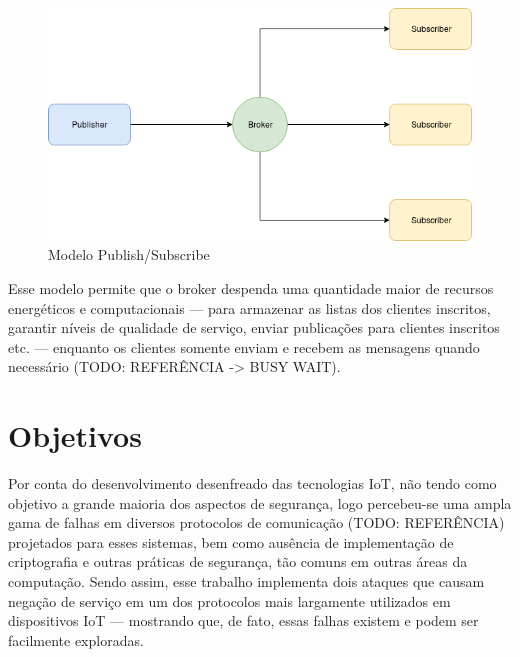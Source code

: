 \begin{figure}[htb]
 \caption{Modelo Publish/Subscribe}
 \label{publish-subscribe}
 \centering
 \includegraphics[scale=0.6]{images/publish-subscribe.png}
 \fautor
\end{figure}


Esse modelo permite que o broker despenda uma quantidade maior de recursos energéticos e computacionais --- para armazenar as listas dos clientes inscritos, garantir níveis de qualidade de serviço, enviar publicações para clientes inscritos etc. --- enquanto os clientes somente enviam e recebem as mensagens quando necessário (TODO: REFERÊNCIA -> BUSY WAIT).









\section{Objetivos}

Por conta do desenvolvimento desenfreado das tecnologias IoT, não tendo como objetivo a grande maioria dos aspectos de segurança, logo percebeu-se uma ampla gama de falhas em diversos protocolos de comunicação (TODO: REFERÊNCIA) projetados para esses sistemas, bem como ausência de implementação de criptografia e outras práticas de segurança, tão comuns em outras áreas da computação. Sendo assim, esse trabalho implementa dois ataques que causam negação de serviço em um dos protocolos mais largamente utilizados em dispositivos IoT --- mostrando que, de fato, essas falhas existem e podem ser facilmente exploradas.









